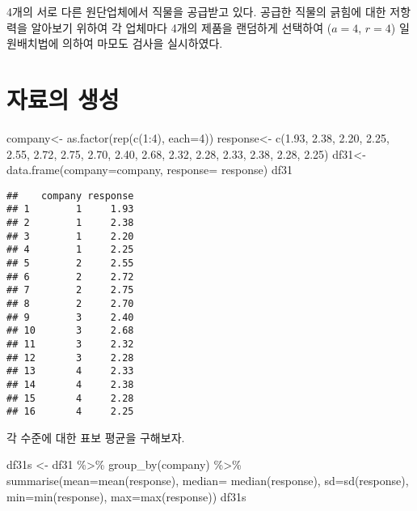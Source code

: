 \documentclass[
]{book}
\newenvironment{Shaded}{\begin{snugshade}}{\end{snugshade}}
\newcommand{\AttributeTok}[1]{\textcolor[rgb]{0.77,0.63,0.00}{#1}}
\newcommand{\DecValTok}[1]{\textcolor[rgb]{0.00,0.00,0.81}{#1}}
\newcommand{\FloatTok}[1]{\textcolor[rgb]{0.00,0.00,0.81}{#1}}
\newcommand{\FunctionTok}[1]{\textcolor[rgb]{0.00,0.00,0.00}{#1}}
\newcommand{\NormalTok}[1]{#1}
\newcommand{\OtherTok}[1]{\textcolor[rgb]{0.56,0.35,0.01}{#1}}
\newcommand{\SpecialCharTok}[1]{\textcolor[rgb]{0.00,0.00,0.00}{#1}}
\begin{document}
4개의 서로 다른 원단업체에서 직물을 공급받고 있다. 공급한 직물의 긁힘에
대한 저항력을 알아보기 위하여 각 업체마다 4개의 제품을 랜덤하게 선택하여
(\(a=4\), \(r=4\)) 일원배치법에 의하여 마모도 검사을 실시하였다.

\hypertarget{uxc790uxb8ccuxc758-uxc0dduxc131}{%
\section{자료의 생성}\label{uxc790uxb8ccuxc758-uxc0dduxc131}}

\begin{Shaded}
\begin{Highlighting}[]
\NormalTok{company}\OtherTok{\textless{}{-}} \FunctionTok{as.factor}\NormalTok{(}\FunctionTok{rep}\NormalTok{(}\FunctionTok{c}\NormalTok{(}\DecValTok{1}\SpecialCharTok{:}\DecValTok{4}\NormalTok{), }\AttributeTok{each=}\DecValTok{4}\NormalTok{))}
\NormalTok{response}\OtherTok{\textless{}{-}} \FunctionTok{c}\NormalTok{(}\FloatTok{1.93}\NormalTok{, }\FloatTok{2.38}\NormalTok{, }\FloatTok{2.20}\NormalTok{, }\FloatTok{2.25}\NormalTok{,}
             \FloatTok{2.55}\NormalTok{, }\FloatTok{2.72}\NormalTok{, }\FloatTok{2.75}\NormalTok{, }\FloatTok{2.70}\NormalTok{,}
             \FloatTok{2.40}\NormalTok{, }\FloatTok{2.68}\NormalTok{, }\FloatTok{2.32}\NormalTok{, }\FloatTok{2.28}\NormalTok{,}
             \FloatTok{2.33}\NormalTok{, }\FloatTok{2.38}\NormalTok{, }\FloatTok{2.28}\NormalTok{, }\FloatTok{2.25}\NormalTok{)}
\NormalTok{df31}\OtherTok{\textless{}{-}} \FunctionTok{data.frame}\NormalTok{(}\AttributeTok{company=}\NormalTok{company, }\AttributeTok{response=}\NormalTok{ response)}
\NormalTok{df31}
\end{Highlighting}
\end{Shaded}

\begin{verbatim}
##    company response
## 1        1     1.93
## 2        1     2.38
## 3        1     2.20
## 4        1     2.25
## 5        2     2.55
## 6        2     2.72
## 7        2     2.75
## 8        2     2.70
## 9        3     2.40
## 10       3     2.68
## 11       3     2.32
## 12       3     2.28
## 13       4     2.33
## 14       4     2.38
## 15       4     2.28
## 16       4     2.25
\end{verbatim}

각 수준에 대한 표보 평균을 구해보자.

\begin{Shaded}
\begin{Highlighting}[]
\NormalTok{df31s }\OtherTok{\textless{}{-}}\NormalTok{ df31 }\SpecialCharTok{\%\textgreater{}\%} \FunctionTok{group\_by}\NormalTok{(company)  }\SpecialCharTok{\%\textgreater{}\%}  \FunctionTok{summarise}\NormalTok{(}\AttributeTok{mean=}\FunctionTok{mean}\NormalTok{(response), }\AttributeTok{median=} \FunctionTok{median}\NormalTok{(response), }\AttributeTok{sd=}\FunctionTok{sd}\NormalTok{(response), }\AttributeTok{min=}\FunctionTok{min}\NormalTok{(response), }\AttributeTok{max=}\FunctionTok{max}\NormalTok{(response))}
\NormalTok{df31s}
\end{Highlighting}
\end{Shaded}
\end{document}
